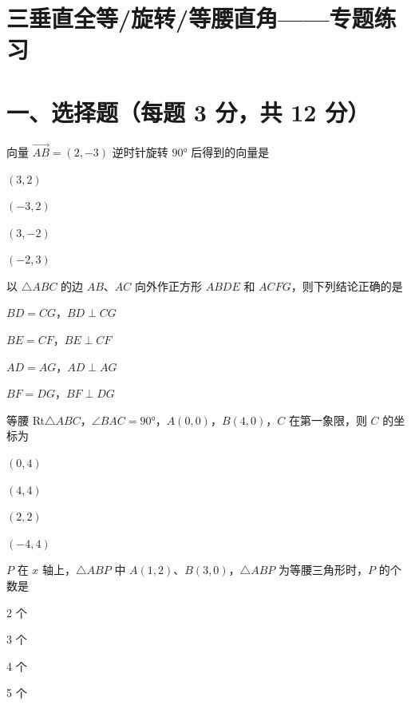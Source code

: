 \documentclass{exam-zh}
\begin{document}
\section*{三垂直全等/旋转/等腰直角——专题练习}

\section*{一、选择题（每题 3 分，共 12 分）}


\begin{question}[points=3]
  向量 $\overrightarrow{AB} = (2, -3)$ 逆时针旋转 $90°$ 后得到的向量是
  \begin{choices}
    \item $(3, 2)$
    \item $(-3, 2)$
    \item $(3, -2)$
    \item $(-2, 3)$
  \end{choices}
\end{question}



\begin{question}[points=3]
  以 $\triangle ABC$ 的边 $AB$、$AC$ 向外作正方形 $ABDE$ 和 $ACFG$，则下列结论正确的是
  \begin{choices}
    \item $BD = CG$，$BD \perp CG$
    \item $BE = CF$，$BE \perp CF$
    \item $AD = AG$，$AD \perp AG$
    \item $BF = DG$，$BF \perp DG$
  \end{choices}
\end{question}



\begin{question}[points=3]
  等腰 Rt$\triangle ABC$，$\angle BAC = 90°$，$A(0,0)$，$B(4,0)$，$C$ 在第一象限，则 $C$ 的坐标为
  \begin{choices}
    \item $(0, 4)$
    \item $(4, 4)$
    \item $(2, 2)$
    \item $(-4, 4)$
  \end{choices}
\end{question}



\begin{question}[points=3]
  $P$ 在 $x$ 轴上，$\triangle ABP$ 中 $A(1,2)$、$B(3,0)$，$\triangle ABP$ 为等腰三角形时，$P$ 的个数是
  \begin{choices}
    \item 2 个
    \item 3 个
    \item 4 个
    \item 5 个
  \end{choices}
\end{question}
\end{document}
